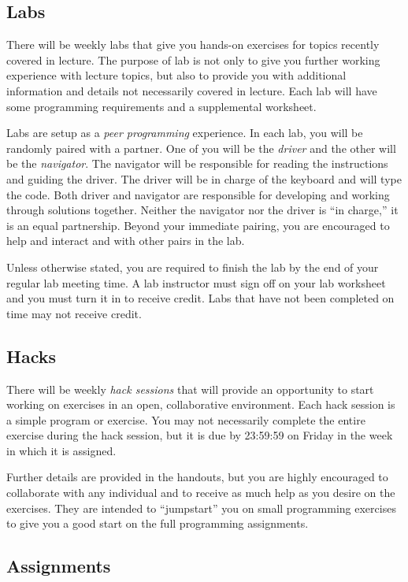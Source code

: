 \documentclass[12pt]{scrartcl}
\begin{document}
\subsection{Labs}

There will be weekly labs that give you hands-on exercises for 
topics recently covered in lecture.  The purpose of lab is not 
only to give you further working experience with lecture topics, 
but also to provide you with additional information and details 
not necessarily covered in lecture.  Each lab will have some 
programming requirements and a supplemental worksheet.  

Labs are setup as a \emph{peer programming} experience.  In each 
lab, you will be randomly paired with a partner.  One of you will 
be the \emph{driver} and the other will be the \emph{navigator}.  
The navigator will be responsible for reading the instructions 
and guiding the driver.  The driver will be in charge of the 
keyboard and will type the code.  Both driver and navigator are 
responsible for developing and working through solutions together.
Neither the navigator nor the driver is ``in charge,'' it is an 
equal partnership.  Beyond your immediate pairing, you are 
encouraged to help and interact and with other pairs in the lab.

Unless otherwise stated, you are required to finish the lab by 
the end of your regular lab meeting time.  A lab instructor must 
sign off on your lab worksheet and you must turn it in to receive 
credit.  Labs that have not been completed on time may not receive
credit. 

\subsection{Hacks}

There will be weekly \emph{hack sessions} that will provide an
opportunity to start working on exercises in an open, collaborative
environment.  Each hack session is a simple program or exercise.
You may not necessarily complete the entire exercise during the hack
session, but it is due by 23:59:59 on Friday in the week in which it
is assigned.

Further details are provided in the handouts, but you are highly 
encouraged to collaborate with any individual and to receive as much
help as you desire on the exercises.  They are intended to ``jumpstart''
you on small programming exercises to give you a good start on the
full programming assignments.

\subsection{Assignments}
\end{document}
